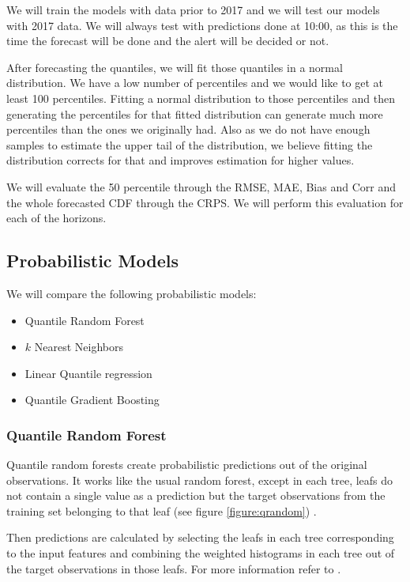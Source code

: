 \documentclass[a4paper,twocolumn,5p]{elsarticle}
\begin{document}
We will train the models with data prior to 2017 and we will test our 
models with 2017 data. We will always test with 
predictions done at 10:00, as this is the time the 
forecast will be done and the alert will be decided 
or not.

After forecasting the quantiles, we will fit those quantiles in a normal distribution.
We have a low number of percentiles and we would like to get at least 100 percentiles.
Fitting a normal distribution to those percentiles and then generating the 
percentiles for that fitted distribution can generate much more percentiles 
than the ones we originally had.
Also as we do not have enough samples to estimate the upper tail of the distribution, 
we believe
fitting the distribution corrects for that and improves estimation for higher values.

We will evaluate the 50 percentile through the 
RMSE, MAE, Bias and Corr 
and the whole forecasted CDF through the CRPS. We will perform
this evaluation for each of the horizons.

\subsection{Probabilistic Models}
\label{sec:models}

We will compare the following probabilistic models:
\begin{itemize}
  \item Quantile Random Forest
  \item $k$ Nearest Neighbors
  \item Linear Quantile regression
  \item Quantile Gradient Boosting 
\end{itemize}

\subsubsection{Quantile Random Forest}

Quantile random forests create probabilistic predictions out of 
the original observations. It works like the usual random forest, 
except in each tree,
leafs do not contain a single value as a prediction but the target observations 
from the training set 
belonging to that leaf (see figure \ref{figure:qrandom}) . 

Then predictions are calculated by selecting the leafs in each tree
corresponding to the input features and combining the weighted 
histograms in each tree out of the target observations in those leafs. 
For more information refer to 
\cite{quantregforests}.
\end{document}

